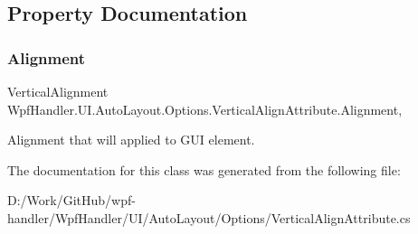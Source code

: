 \subsection{Property Documentation}
\mbox{\label{class_wpf_handler_1_1_u_i_1_1_auto_layout_1_1_options_1_1_vertical_align_attribute_a71a12b8962ff5c070830d42c1909ff75}} 
\subsubsection{\texorpdfstring{Alignment}{Alignment}}
{\footnotesize\ttfamily Vertical\+Alignment Wpf\+Handler.\+U\+I.\+Auto\+Layout.\+Options.\+Vertical\+Align\+Attribute.\+Alignment\hspace{0.3cm}{\ttfamily [get]}, {\ttfamily [set]}}



Alignment that will applied to G\+UI element. 



The documentation for this class was generated from the following file\+:\begin{DoxyCompactItemize}
\item 
D\+:/\+Work/\+Git\+Hub/wpf-\/handler/\+Wpf\+Handler/\+U\+I/\+Auto\+Layout/\+Options/Vertical\+Align\+Attribute.\+cs\end{DoxyCompactItemize}
